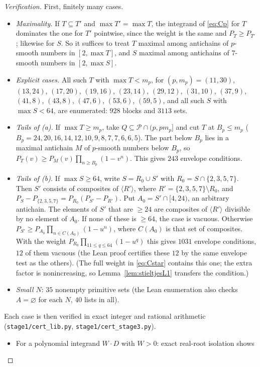 \documentclass[11pt]{article}
\theoremstyle{remark}
\newcommand{\Prm}{\mathcal{P}}
\newcommand{\sm}[1]{\langle #1\rangle}
\begin{document}
\begin{proof}[Verification]
First, finitely many cases.
\begin{itemize}
\item \emph{Maximality.} If $T\subseteq T'$ and $\max T'=\max T$, the integrand of \eqref{eq:Cp}
for $T$ dominates the one for $T'$ pointwise, since the weight is the same and $P_T\ge P_{T'}$;
likewise for $S$. So it suffices to treat $T$ maximal among antichains of $p$-smooth numbers in
$[2,\max T]$, and $S$ maximal among antichains of $7$-smooth numbers in $[2,\max S]$.
\item \emph{Explicit cases.} All such $T$ with $\max T<m_p$, for
$(p,m_p)=(11,30)$, $(13,24)$, $(17,20)$, $(19,16)$, $(23,14)$, $(29,12)$, $(31,10)$, $(37,9)$,
$(41,8)$, $(43,8)$, $(47,6)$, $(53,6)$, $(59,5)$, and all such $S$ with $\max S<64$, are
enumerated: $928$ blocks and $3113$ sets.
\item \emph{Tails of (a).} If $\max T\ge m_p$, take $Q\subseteq\Prm\cap(p,pm_p]$ and cut $T$ at
$B_p\le m_p$ ($B_p=24,20,16,14,12,10,9,8,7,7,6,6,5$). The part below $B_p$ lies in a maximal
antichain $M$ of $p$-smooth numbers below $B_p$, so $P_T(v)\ge P_M(v)\prod_{n\ge B_p}(1-v^n)$.
This gives $243$ envelope conditions.
\item \emph{Tails of (b).} If $\max S\ge64$, write $S=R_0\cup S'$ with $R_0=S\cap\{2,3,5,7\}$.
Then $S'$ consists of composites of $\sm{R'}$, where $R'=\{2,3,5,7\}\setminus R_0$, and
$P_S-P_{\{2,3,5,7\}}=P_{R_0}(P_{S'}-P_{R'})$. Put $A_0=S'\cap[4,24)$, an arbitrary antichain. The
elements of $S'$ that are $\ge24$ are composites of $\sm{R'}$ divisible by no element of $A_0$. If
none of these is $\ge64$, the case is vacuous. Otherwise
$P_{S'}\ge P_{A_0}\prod_{n\in C(A_0)}(1-u^n)$, where $C(A_0)$ is that set of composites. With the
weight $P_{R_0}\prod_{11\le q\le64}(1-u^q)$ this gives $1031$ envelope conditions, $12$ of them
vacuous (the Lean proof certifies these $12$ by the same envelope test as the others). (The full weight in \eqref{eq:Cstar} contains this one; the extra factor is nonincreasing,
so Lemma~\ref{lem:stieltjesL1} transfers the condition.)
\item \emph{Small $N$}: $35$ nonempty primitive sets (the Lean enumeration also checks
$A=\varnothing$ for each $N$, $40$ lists in all).
\end{itemize}
Each case is then verified in exact integer and rational arithmetic
(\texttt{stage1/cert\_lib.py}, \texttt{stage1/cert\_stage3.py}).
\begin{itemize}
\item[(SC)] For a polynomial integrand $W\cdot D$ with $W>0$: exact real-root isolation shows

\end{itemize}
\end{proof}
\end{document}
